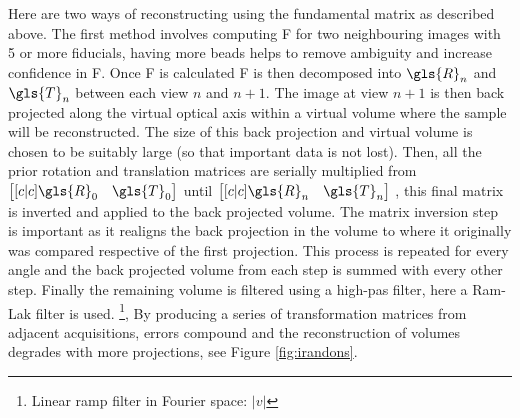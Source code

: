 Here are two ways of reconstructing using the \Gls{fundamental matrix} as described above.
The first method involves computing \gls{F} for two neighbouring images with 5 or more fiducials, having more beads helps to remove ambiguity and increase confidence in \gls{F}.
Once \gls{F} is calculated \gls{F} is then decomposed into \(\gls{R}_n\) and \(\gls{T}_n\) between each view \(n\) and \(n+1\).
The image at view \(n+1\) is then back projected along the virtual optical axis within a virtual volume where the sample will be reconstructed.
The size of this back projection and virtual volume is chosen to be suitably large (so that important data is not lost).
Then, all the prior rotation and translation matrices are serially multiplied from \(\begin{bmatrix}[c|c] \gls{R}_0&\gls{T}_0 \end{bmatrix}\) until \(\begin{bmatrix}[c|c] \gls{R}_n&\gls{T}_n \end{bmatrix}\) %
, this final matrix is inverted and applied to the back projected volume.
The matrix inversion step is important as it realigns the back projection in the volume to where it originally was compared respective of the first projection.
This process is repeated for every angle and the back projected volume from each step is summed with every other step.
Finally the remaining volume is filtered using a high-pas filter, here a Ram-Lak filter is used.
\footnote{Linear ramp filter in Fourier space: \(|v|\)},
By producing a series of transformation matrices from adjacent acquisitions, errors compound and the reconstruction of volumes degrades with more projections, see Figure \ref{fig:irandons}.

